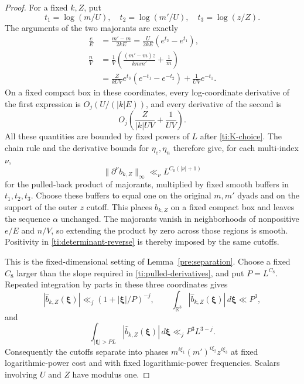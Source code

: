 \begin{proof}
For a fixed $k,Z$, put
\[
 t_1=\log(m/U),\quad t_2=\log(m'/U),\quad t_3=\log(z/Z).
\]
The arguments of the two majorants are exactly
\begin{equation}\label{ti:pulled-cutoffs}
 \begin{split}
 \frac eE
    &=\frac{m'-m}{2kE}
      =\frac{U}{2kE}(e^{t_2}-e^{t_1}),\\
 \frac nV
    &=\frac1V\left(\frac{(m'-m)z}{kmm'}+\frac1m\right)\\
    &=\frac{Z}{kUV}e^{t_3}(e^{-t_1}-e^{-t_2})
                                      +\frac1{UV}e^{-t_1}.
 \end{split}
\end{equation}
On a fixed compact box in these coordinates, every log-coordinate
derivative of the first expression is
$O_j(U/(|k|E))$, and every derivative of the second is
\[
                  O_j\left(\frac{Z}{|k|UV}+\frac1{UV}\right).
\]
All these quantities are bounded by fixed powers of $L$ after
\eqref{ti:K-choice}. The chain rule and the derivative bounds for
$\eta_e,\eta_n$ therefore give, for each multi-index $\nu$,
\begin{equation}\label{ti:pulled-derivatives}
             \|\partial^\nu b_{k,Z}\|_\infty
                         \ll_\nu L^{C_0(|\nu|+1)}
\end{equation}
for the pulled-back product of majorants, multiplied by fixed smooth
buffers in $t_1,t_2,t_3$. Choose these buffers to equal one on the
original $m,m'$ dyads and on the support of the outer $z$ cutoff.
This places $b_{k,Z}$ on a fixed compact box and leaves the sequence
$\alpha$ unchanged. The majorants vanish in neighborhoods of
nonpositive $e/E$ and $n/V$, so extending the product by zero across
those regions is smooth. Positivity in
\eqref{ti:determinant-reverse} is thereby imposed by the same cutoffs.

This is the fixed-dimensional setting of Lemma~\ref{pre:separation}.
Choose a fixed $C_8$ larger than the slope required in
\eqref{ti:pulled-derivatives}, and put $P=L^{C_8}$. Repeated
integration by parts in these three coordinates gives
\[
 |\widehat b_{k,Z}(\boldsymbol\xi)|
       \ll_j(1+|\boldsymbol\xi|/P)^{-j},\qquad
 \int_{\mathbb R^3}|\widehat b_{k,Z}(\boldsymbol\xi)|
                                      \,d\boldsymbol\xi\ll P^3,
\]
and
\begin{equation}\label{ti:post-fourier-tail}
 \int_{|\boldsymbol\xi|>PL}|\widehat b_{k,Z}(\boldsymbol\xi)|
                 \,d\boldsymbol\xi\ll_j P^3L^{3-j}.
\end{equation}
Consequently the cutoffs separate into phases
$m^{i\xi_1}(m')^{i\xi_2}z^{i\xi_3}$ at fixed logarithmic-power
cost and with fixed logarithmic-power frequencies. Scalars involving
$U$ and $Z$ have modulus one.


\end{proof}
